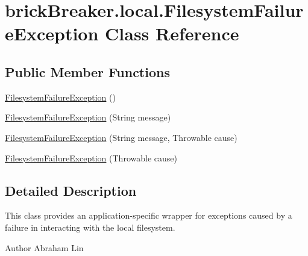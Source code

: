 \hypertarget{classbrick_breaker_1_1local_1_1_filesystem_failure_exception}{
\section{brickBreaker.local.FilesystemFailureException Class Reference}
\label{classbrick_breaker_1_1local_1_1_filesystem_failure_exception}
}
\subsection*{Public Member Functions}
\begin{DoxyCompactItemize}
\item 
\hyperlink{classbrick_breaker_1_1local_1_1_filesystem_failure_exception_ab904cd4c69c1a418f1651cd72822e967}{FilesystemFailureException} ()
\item 
\hyperlink{classbrick_breaker_1_1local_1_1_filesystem_failure_exception_a6dbc8c054777a998dbd706490b6d5fd5}{FilesystemFailureException} (String message)
\item 
\hyperlink{classbrick_breaker_1_1local_1_1_filesystem_failure_exception_adac73a32ed79f64fddf90293d68506ad}{FilesystemFailureException} (String message, Throwable cause)
\item 
\hyperlink{classbrick_breaker_1_1local_1_1_filesystem_failure_exception_aa72dd755aa1b25516a2fda4c08eb0551}{FilesystemFailureException} (Throwable cause)
\end{DoxyCompactItemize}


\subsection{Detailed Description}
This class provides an application-\/specific wrapper for exceptions caused by a failure in interacting with the local filesystem.

\begin{DoxyAuthor}{Author}
Abraham Lin 
\end{DoxyAuthor}


